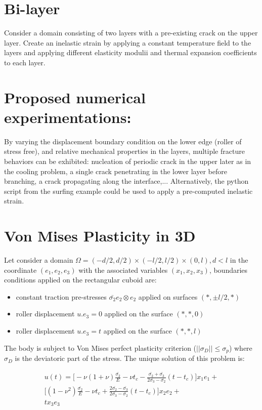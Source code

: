 \documentclass[10pt,oneside]{memoir}
\begin{document}
\section{Bi-layer}
Consider a domain consisting of two layers with a pre-existing crack on the upper layer. Create an inelastic strain by applying a constant temperature field to the layers and applying different elasticity modulii and thermal expansion coefficients to each layer.

\section*{Proposed numerical experimentations:}
By varying the displacement boundary condition on the lower edge (roller of stress free), and relative mechanical properties in the layers, multiple fracture behaviors can be exhibited: nucleation of periodic crack in the upper later as in the cooling problem, a single crack penetrating in the lower layer before branching, a crack propagating along the interface,...
Alternatively, the python script from the surfing example could be used to apply a pre-computed inelastic strain.

\section{Von Mises Plasticity in 3D}
Let consider a domain $\Omega= (-d/2,d/2) \times (-l/2,l/2) \times (0,l), d<l$ in the coordinate $(e_1, e_2, e_3)$ with the associated variables $(x_1, x_2, x_3)$, boundaries conditions applied on the rectangular cuboid are:
\begin{itemize}
\item constant traction pre-stresses $\bar{\sigma_2} e_2 \otimes e_2$ applied on surfaces $(*, \pm l/2,*)$
\item roller displacement $u.e_3 = 0$ applied on the surface $(*,*,0)$
\item roller displacement $u.e_3 = t$ applied on the surface $(*,*,l)$
\end{itemize}

The body is subject to Von Mises perfect plasticity criterion ($||\sigma_D|| \leq \sigma_p$) where $\sigma_D$ is the deviatoric part of the stress. The unique solution of this problem is:

\begin{equation}
\begin{split}
\label{eq:UsolVonMises3D}
u(t)= \Big[ -\nu(1+\nu)\frac{\bar{\sigma_2}}{E} -\nu t_c - \frac{\bar{\sigma_2}+\bar{\sigma_3}}{2\bar{\sigma_3}-\bar{\sigma_2}} (t-t_c)\Big]x_1 e_1+\\
	\Big[ (1-\nu^2)\frac{\bar{\sigma_2}}{E} - \nu t_c + \frac{2\bar{\sigma_2}-\bar{\sigma_3}}{2\bar{\sigma_3}-\bar{\sigma_2}}(t-t_c) \Big] x_2 e_2 + \\
	t x_3 e_3
\end{split}
\end{equation}
\end{document}
